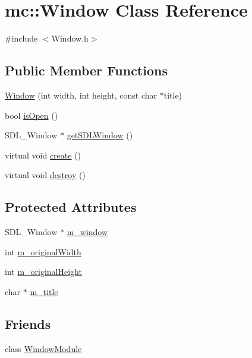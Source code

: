 \hypertarget{classmc_1_1_window}{}\section{mc\+:\+:Window Class Reference}
\label{classmc_1_1_window}


{\ttfamily \#include $<$Window.\+h$>$}

\subsection*{Public Member Functions}
\begin{DoxyCompactItemize}
\item 
\hyperlink{classmc_1_1_window_a55f349e85260b2cab01941534df62954}{Window} (int width, int height, const char $\ast$title)
\item 
bool \hyperlink{classmc_1_1_window_acefbda4736db354ba98cef6d6489a0f1}{is\+Open} ()
\item 
S\+D\+L\+\_\+\+Window $\ast$ \hyperlink{classmc_1_1_window_a741a653af7b767e39a1d517fd1844674}{get\+S\+D\+L\+Window} ()
\item 
virtual void \hyperlink{classmc_1_1_window_ac9844e316c03c49e69528bd3a345a58d}{create} ()
\item 
virtual void \hyperlink{classmc_1_1_window_a2f62d5937f19a26c0d8349efd1ce75bd}{destroy} ()
\end{DoxyCompactItemize}
\subsection*{Protected Attributes}
\begin{DoxyCompactItemize}
\item 
S\+D\+L\+\_\+\+Window $\ast$ \hyperlink{classmc_1_1_window_a8df84ee7c278f016ef13ac0ede008f7c}{m\+\_\+window}
\item 
int \hyperlink{classmc_1_1_window_a1f4c4744822006d438a532282d2b36c5}{m\+\_\+original\+Width}
\item 
int \hyperlink{classmc_1_1_window_aef96e2ff220e319a9a87cf4ced39ddaf}{m\+\_\+original\+Height}
\item 
char $\ast$ \hyperlink{classmc_1_1_window_a27f0a568dfe2d21915debc0672dd072e}{m\+\_\+title}
\end{DoxyCompactItemize}
\subsection*{Friends}
\begin{DoxyCompactItemize}
\item 
class \hyperlink{classmc_1_1_window_a832d299d0131fc9740d25c15c804e42e}{Window\+Module}
\end{DoxyCompactItemize}


